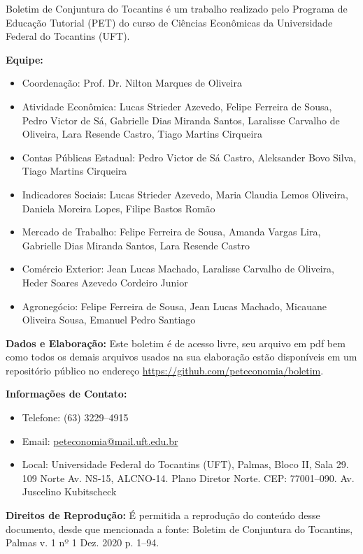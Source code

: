 \begin{tcolorbox}[colback=boxbackground, colframe=boxbackground, arc=0mm, top=15pt]
Boletim de Conjuntura do Tocantins é um trabalho realizado pelo Programa de Educação Tutorial (PET) do curso de Ciências Econômicas da Universidade Federal do Tocantins (UFT).
\\
\par{\bf Equipe:}
\begin{itemize}
	\item{Coordenação:} Prof. Dr. Nilton Marques de Oliveira
	\item{Atividade Econômica:} Lucas Strieder Azevedo, Felipe Ferreira de Sousa, Pedro Victor de Sá, Gabrielle Dias Miranda Santos, Laralisse Carvalho de Oliveira, Lara Resende Castro, Tiago Martins Cirqueira
	\item{Contas Públicas Estadual:} Pedro Victor de Sá Castro, Aleksander Bovo Silva, Tiago Martins Cirqueira
	\item{Indicadores Sociais:} Lucas Strieder Azevedo, Maria Claudia Lemos Oliveira, Daniela Moreira Lopes, Filipe Bastos Romão
	\item{Mercado de Trabalho:} Felipe Ferreira de Sousa, Amanda Vargas Lira, Gabrielle Dias Miranda Santos, Lara Resende Castro
	\item{Comércio Exterior:} Jean Lucas Machado,  Laralisse Carvalho de Oliveira, Heder Soares Azevedo Cordeiro Junior
	\item{Agronegócio:} Felipe Ferreira de Sousa, Jean Lucas Machado, Micauane Oliveira Sousa, Emanuel Pedro Santiago
\end{itemize}
\par{\bf Dados e Elaboração:}
Este boletim é de acesso livre, seu arquivo em pdf bem como todos os demais arquivos usados na sua elaboração estão disponíveis em um repositório público no endereço \url{https://github.com/peteconomia/boletim}.
\\
\par{\bf Informações de Contato:}
\begin{itemize}
	\item{Telefone:} (63) 3229--4915
	\item{Email:} \url{peteconomia@mail.uft.edu.br}
	\item{Local:} Universidade Federal do Tocantins (UFT), Palmas, Bloco II, Sala 29. 109 Norte Av. NS-15, ALCNO-14. Plano Diretor Norte. CEP: 77001--090. Av. Juscelino Kubitscheck
\end{itemize}
\par{\bf Direitos de Reprodução:}
É permitida a reprodução do conteúdo desse documento, desde que mencionada a fonte: Boletim de Conjuntura do Tocantins, Palmas v. 1 nº 1 Dez. 2020 p. 1--94.
\end{tcolorbox}